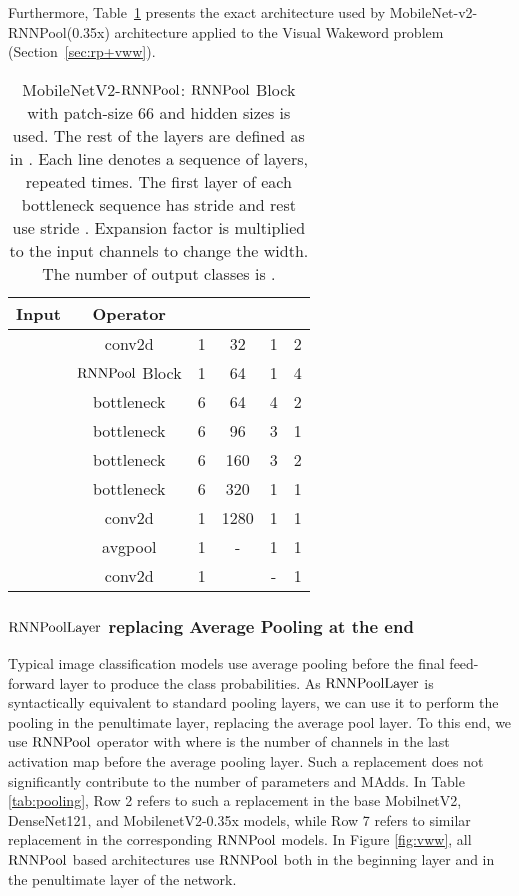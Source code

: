 \documentclass[10pt]{article}
\newcommand{\rpool}{\ensuremath{{\rm RNNPool}}\xspace}
\newcommand{\rpoollayer}{\ensuremath{{\rm RNNPoolLayer}}\xspace}
\newcommand{\alg}{\rpool}
\begin{document}
Furthermore, Table~\ref{tab:mobilenetv2-rp} presents the exact architecture used by MobileNet-v2-RNNPool(0.35x) architecture applied to the Visual Wakeword problem (Section~\ref{sec:rp+vww}).  
\begin{table}[h]
\centering
    \caption{\footnotesize MobileNetV2-\alg : \rpool Block with patch-size 66 and hidden sizes  is used.
The rest of the layers are defined as in \cite{sandler2018mobilenetv2}. Each line denotes a sequence of
    layers, repeated  times. The first layer of each bottleneck
    sequence has stride  and rest use stride . Expansion factor
     is multiplied to the input channels to change the width. The number of output classes is .}
    \begin{tabular}{ c | c | c | c | c | c }
      \toprule
	  {Input} & {Operator} &  &  &  & \\
	  \midrule
	   & conv2d  & 1 & 32 & 1 & 2\\
	   & \alg Block & 1 & 64 & 1 & 4\\
	   & bottleneck & 6 & 64 & 4 & 2\\
	   & bottleneck & 6 & 96 & 3 & 1\\
	   & bottleneck & 6 & 160 & 3 & 2\\
		 & bottleneck & 6 & 320 & 1 & 1\\
	   & conv2d  & 1 & 1280 & 1 & 1\\
	   & avgpool  & 1 & - & 1 & 1\\
	   & conv2d  & 1 &  & - & 1\\
	  \bottomrule
  \end{tabular}
    \label{tab:mobilenetv2-rp}
\end{table} 

\subsubsection{\rpoollayer replacing Average Pooling at the end}
Typical image classification models use average pooling before the final feed-forward layer to produce the class probabilities. As \rpoollayer is syntactically equivalent to standard pooling layers, we can use it to perform the pooling in the penultimate layer, replacing the average pool layer. To this end, we use \rpool operator with   where  is the number of channels in the last activation map before the average pooling layer. Such a replacement does not significantly contribute to the number of parameters and MAdds. In Table \ref{tab:pooling}, Row 2 refers to such a replacement in the base MobilnetV2, DenseNet121, and MobilenetV2-0.35x models, while Row 7 refers to similar replacement in the corresponding \rpool models. In Figure \ref{fig:vww}, all \rpool based architectures use \rpool both in the beginning layer and in the penultimate layer of the network. 
\end{document}
